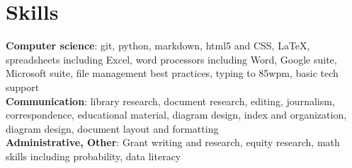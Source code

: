 \section{Skills}
    \begin{itemize}[leftmargin=0.15in, label={}]
	\small{\item{
		\textbf{Computer science}{: git, python, markdown, html5 and CSS, LaTeX, spreadsheets including Excel, word processors including Word, Google suite, Microsoft suite, file management best practices, typing to 85wpm, basic tech support} \\
		\textbf{Communication}{: library research, document research, editing, journalism, correspondence, educational material, diagram design, index and organization, diagram design, document layout and formatting} \\
		\textbf{Administrative, Other}{: Grant writing and research, equity research, math skills including probability, data literacy}
	}}
    \end{itemize}